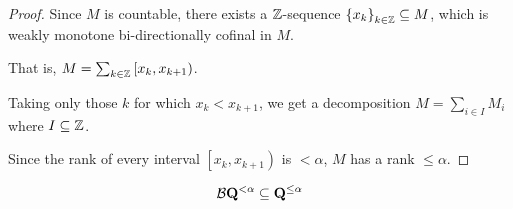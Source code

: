 \begin{proof}
  Since $M$ is countable, there exists a $\mathbb{Z}$-sequence $\left\{ {x_k} \right\}_{k \in \mathbb{Z}} \subseteq M$,
  which is weakly monotone bi-directionally cofinal in $M$.

  That is, $M = \sum_{k \in \mathbb{Z}} \left[ x_k, x_{k + 1} \right)$.

  Taking only those $k$ for which $x_k < x_{k + 1}$, we get a decomposition
  $M = \sum_{i \in I} M_i$ where $I \subseteq \mathbb{Z}$.

  Since the rank of every interval $\left[ x_k, x_{k + 1} \right)$ is $< \alpha$,
  $M$ has a rank $\le \alpha$.
\end{proof}

\begin{corollary}
  $$\mathcal{B}{\mathbf{Q}^{< \alpha}} \subseteq \mathbf{Q}^{\le \alpha}$$
\end{corollary}